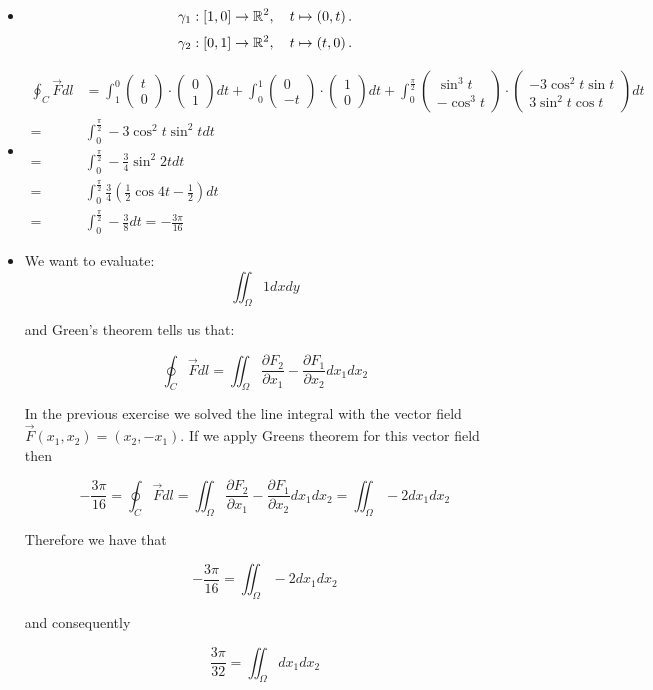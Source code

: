 \documentclass[11pt]{article}
\begin{document}
\begin{solution}     
\begin{itemize}
\item\begin{align*}
        \gamma_1 : \left[1,0\right] \to \mathbb{R}^2, \quad t \mapsto \left( 0, t \right).
    \end{align*}
\begin{align*}
        \gamma_2 : \left[0,1\right] \to \mathbb{R}^2, \quad t \mapsto \left( t, 0 \right).
    \end{align*}
\item \begin{align*}
\oint_C \vec F dl &= \int_1^0 \begin{pmatrix} t\\ 0\end{pmatrix}\cdot \begin{pmatrix} 0\\ 1\end{pmatrix}dt +  \int_0^1 \begin{pmatrix} 0\\ -t\end{pmatrix}\cdot \begin{pmatrix} 1\\ 0\end{pmatrix}dt +  \int_0^{\frac{\pi}{2}} \begin{pmatrix} \sin^3t\\ -\cos^3 t\end{pmatrix}\cdot \begin{pmatrix} -3\cos^2 t \sin t\\ 3\sin^2 t \cos t\end{pmatrix}dt\\
=&\int_0^{\frac{\pi}{2}} -3\cos^2 t\sin^2 tdt\\
=&\int_0^{\frac{\pi}{2}} -\frac{3}{4}\sin^2 2t dt\\
=&\int_0^{\frac{\pi}{2}} \frac{3}{4}\left(\frac{1}{2} \cos 4t - \frac{1}{2}\right)dt\\
=&\int_0^{\frac{\pi}{2}} -\frac{3}{8}dt = -\frac{3\pi}{16}
\end{align*}
\item We want to evaluate:
$$
\iint_{\Omega} 1 dxdy
$$

and Green's theorem tells us that:

$$
\oint_C \vec F dl  = \iint_{\Omega} \frac{\partial F_2}{\partial x_1} - \frac{\partial F_1}{\partial x_2} dx_1dx_2
$$

In the previous exercise we solved the line integral with the vector field $\vec F(x_1,x_2) = (x_2,-x_1)$. If we apply Greens theorem for this vector field then

$$
-\frac{3\pi}{16} = \oint_C \vec F dl  =  \iint_{\Omega} \frac{\partial F_2}{\partial x_1} - \frac{\partial F_1}{\partial x_2} dx_1dx_2 = \iint_{\Omega} -2 dx_1dx_2
$$

Therefore we have that

$$
-\frac{3\pi}{16} =  \iint_{\Omega} -2 dx_1dx_2
$$

and consequently 

$$
\frac{3\pi}{32} =  \iint_{\Omega} dx_1dx_2
$$
\end{itemize}
\end{solution}
\end{document}
